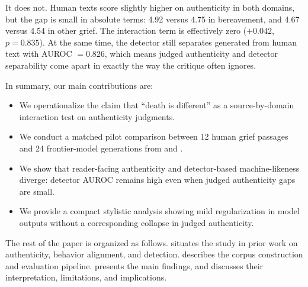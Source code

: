 It does not. Human texts score slightly higher on authenticity in both domains, but the gap is small in absolute terms: 4.92 versus 4.75 in bereavement, and 4.67 versus 4.54 in other grief. The interaction term is effectively zero ($+0.042$, $p=0.835$). At the same time, the detector still separates generated from human text with AUROC $=0.826$, which means judged authenticity and detector separability come apart in exactly the way the critique often ignores.

In summary, our main contributions are:
\begin{itemize}[leftmargin=*,itemsep=0pt,topsep=0pt]
    \item We operationalize the claim that ``death is different'' as a source-by-domain interaction test on authenticity judgments.
    \item We conduct a matched pilot comparison between 12 human grief passages and 24 frontier-model generations from \gptfive and \claudesonnet.
    \item We show that reader-facing authenticity and detector-based machine-likeness diverge: detector AUROC remains high even when judged authenticity gaps are small.
    \item We provide a compact stylistic analysis showing mild regularization in model outputs without a corresponding collapse in judged authenticity.
\end{itemize}

The rest of the paper is organized as follows.  situates the study in prior work on authenticity, behavior alignment, and detection.  describes the corpus construction and evaluation pipeline.  presents the main findings, and  discusses their interpretation, limitations, and implications.
